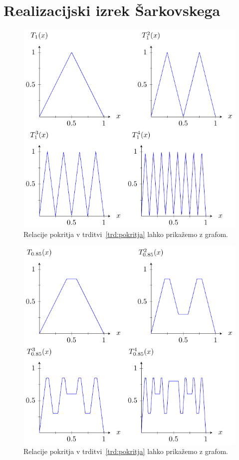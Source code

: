 \documentclass[mat2]{fmfdelo}
\begin{document}
\section{Realizacijski izrek Šarkovskega}\label{sec:realizacija}
\begin{figure}[h]
  \centering
  \includegraphics{images/funkcija_T1.pdf}
  \caption[Primer vektorske slike.]{Relacije pokritja v trditvi~\ref{trd:pokritja} lahko prikažemo z grafom.}
  \label{fig:T1}
\end{figure}

\begin{figure}[h]
  \centering
  \includegraphics{images/odrezana_funkcija.pdf}
  \caption[Primer vektorske slike.]{Relacije pokritja v trditvi~\ref{trd:pokritja} lahko prikažemo z grafom.}
  \label{fig:nkotnik}
\end{figure}
\end{document}

